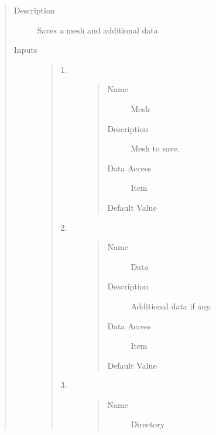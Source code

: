 \documentclass[letterpaper,10pt,english]{sphinxmanual}
\begin{document}
\begin{quote}\begin{description}
\item[{Description}] \leavevmode
Saves a mesh and additional data

\item[{Inputs}] \leavevmode\begin{quote}\begin{description}
\item[{1.}] \leavevmode\begin{quote}\begin{description}
\item[{Name}] \leavevmode
Mesh

\item[{Description}] \leavevmode
Mesh to save.

\item[{Data Access}] \leavevmode
Item

\item[{Default Value}] \leavevmode
{}

\end{description}\end{quote}

\item[{2.}] \leavevmode\begin{quote}\begin{description}
\item[{Name}] \leavevmode
Data

\item[{Description}] \leavevmode
Additional data if any.

\item[{Data Access}] \leavevmode
Item

\item[{Default Value}] \leavevmode
{}

\end{description}\end{quote}

\item[{3.}] \leavevmode\begin{quote}\begin{description}
\item[{Name}] \leavevmode
Directory


\end{description}
\end{quote}
\end{description}
\end{quote}
\end{description}
\end{quote}
\end{document}
